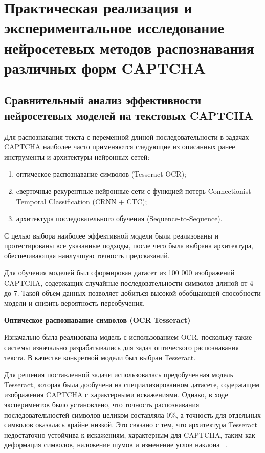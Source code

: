 \chapter{Практическая реализация и экспериментальное исследование нейросетевых методов распознавания различных форм CAPTCHA}

\section{Сравнительный анализ эффективности нейросетевых моделей на текстовых CAPTCHA}

Для распознавания текста с переменной длиной последовательности в задачах CAPTCHA 
наиболее часто применяются следующие из описанных ранее инструменты и архитектуры 
нейронных сетей:

\begin{enumerate}
    \item оптическое распознавание символов (Tesseract OCR);
    \item cверточные рекурентные нейронные сети с функцией потерь Connectionist 
    Temporal Classification (CRNN + CTC);
    \item архитектура последовательного обучения (Sequence-to-Sequence).
\end{enumerate}

С целью выбора наиболее эффективной модели были реализованы и протестированы все 
указанные подходы, после чего была выбрана архитектура, обеспечивающая наилучшую 
точность предсказаний.

Для обучения моделей был сформирован датасет из 100 000 изображений CAPTCHA, 
содержащих случайные последовательности символов длиной от 4 до 7. Такой объем 
данных позволяет добиться высокой обобщающей способности модели и снизить 
вероятность переобучения.

\textbf{Оптическое распознавание символов (OCR Tesseract)}

Изначально была реализована модель с использованием OCR, поскольку такие системы 
изначально разрабатывались для задач оптического распознавания текста. В качестве 
конкретной модели был выбран Tesseract.

Для решения поставленной задачи использовалась предобученная модель Tesseract, 
которая была дообучена на специализированном датасете, содержащем изображения 
CAPTCHA с характерными искажениями. Однако, в ходе экспериментов было установлено, 
что точность распознавания последовательностей символов целиком составляла 0\%, а 
точность для отдельных символов оказалась крайне низкой. Это связано с тем, что 
архитектура Tesseract недостаточно устойчива к искажениям, характерным для 
CAPTCHA, таким как деформация символов, наложение шумов и изменение углов наклона
~\cite{TrainTesseract}.

